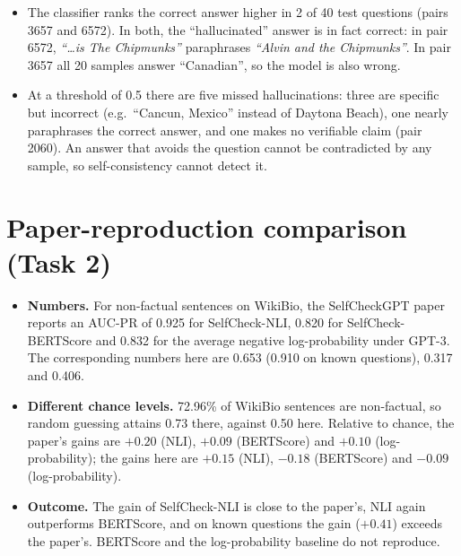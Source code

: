 \documentclass[11pt,a4paper]{article}
\begin{document}
\begin{itemize}
  \item The classifier ranks the correct answer higher in 2 of 40 test questions (pairs 3657 and
        6572). In both, the ``hallucinated'' answer is in fact correct: in pair 6572,
        \emph{``\ldots is The Chipmunks''} paraphrases \emph{``Alvin and the Chipmunks''}. In pair
        3657 all 20 samples answer ``Canadian'', so the model is also wrong.
  \item At a threshold of 0.5 there are five missed hallucinations: three are specific but
        incorrect (e.g.\ ``Cancun, Mexico'' instead of Daytona Beach), one nearly paraphrases the
        correct answer, and one makes no verifiable claim (pair 2060). An answer that avoids the
        question cannot be contradicted by any sample, so self-consistency cannot detect it.
\end{itemize}

\section{Paper-reproduction comparison (Task 2)}\label{sec:paper}

\begin{itemize}
  \item \textbf{Numbers.} For non-factual sentences on WikiBio, the SelfCheckGPT paper reports an
        AUC-PR of 0.925 for SelfCheck-NLI, 0.820 for SelfCheck-BERTScore and 0.832 for the average
        negative log-probability under GPT-3. The corresponding numbers here are 0.653 (0.910 on
        known questions), 0.317 and 0.406.
  \item \textbf{Different chance levels.} 72.96\% of WikiBio sentences are non-factual, so random
        guessing attains 0.73 there, against 0.50 here. Relative to chance, the paper's gains are
        $+0.20$ (NLI), $+0.09$ (BERTScore) and $+0.10$ (log-probability); the gains here are
        $+0.15$ (NLI), $-0.18$ (BERTScore) and $-0.09$ (log-probability).
  \item \textbf{Outcome.} The gain of SelfCheck-NLI is close to the paper's, NLI again outperforms
        BERTScore, and on known questions the gain ($+0.41$) exceeds the paper's. BERTScore and the
        log-probability baseline do not reproduce.
\end{itemize}
\end{document}

